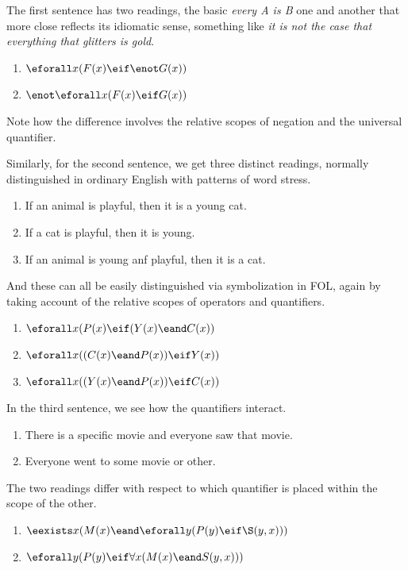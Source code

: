 The first sentence has two readings, the basic \emph{every A is B} one and
another that more close reflects its idiomatic sense, something like
\emph{it is not the case that everything that glitters is gold}. 

\begin{enumerate}
\item $\eforall x(F(x)\eif\enot G(x))$
\item $\enot\eforall x(F(x)\eif G(x))$
\end{enumerate}

Note how the difference involves the relative scopes of negation and the
universal quantifier.

Similarly, for the second sentence, we get three distinct readings, normally
distinguished in ordinary English with patterns of word stress.

\begin{enumerate}
\item If an animal is playful, then it is a young cat.
\item If a cat is playful, then it is young.
\item If an animal is young anf playful, then it is a cat. 
\end{enumerate}

And these can all be easily distinguished via symbolization in FOL, again by
taking account of the relative scopes of operators and quantifiers.

\begin{enumerate}
\item $\eforall x(P(x)\eif(Y(x)\eand C(x))$ 
\item $\eforall x((C(x)\eand P(x))\eif Y(x))$ 
\item $\eforall x((Y(x)\eand P(x))\eif C(x))$ 
\end{enumerate}

In the third sentence, we see how the quantifiers interact. 

\begin{enumerate}
\item There is a specific movie and everyone saw that movie.
\item Everyone went to some movie or other.
\end{enumerate}

The two readings differ with respect to which quantifier is placed within the
scope of the other.

\begin{enumerate}
\item $\eexists x(M(x)\eand\eforall y(P(y)\eif\S(y,x)))$
\item $\eforall y(P(y)\eif\forall x(M(x)\eand S(y,x)))$
\end{enumerate}


